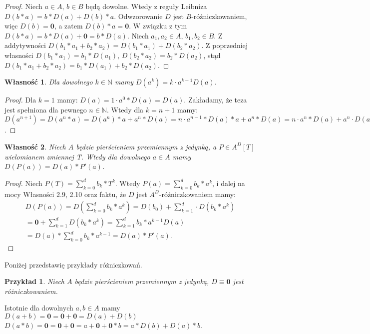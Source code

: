 \documentclass[12pt,a4paper]{article}
\newtheorem{exs}[ex]{Przykład}
\newtheorem{wl}{Własność}[section]
\numberwithin{equation}{section}
\begin{document}
\begin{proof}
Niech $a \in A$, $b \in B$ będą dowolne. Wtedy z reguły Leibniza $D(b*a)=b*D(a)+D(b)*a$. Odwzorowanie $D$ jest $B$-różniczkowaniem, więc $D(b)=\textbf{0}$, a zatem $D(b)*a=\textbf{0}$. W związku z tym  $D(b*a)=b*D(a)+\textbf{0}=b*D(a)$. Niech $a_{1},a_{2} \in A$, $b_{1},b_{2} \in B$. Z addytywności $D(b_{1}*a_{1}+b_{2}*a_{2})=D(b_{1}*a_{1})+D(b_{2}*a_{2})$. Z poprzedniej własności $D(b_{1}*a_{1})=b_{1}*D(a_{1})$, $D(b_{2}*a_{2})=b_{2}*D(a_{2})$, stąd  $D(b_{1}*a_{1}+b_{2}*a_{2})=b_{1}*D(a_{1})+b_{2}*D(a_{2})$.
\end{proof}
\begin{wl}
Dla dowolnego $k \in \mathbb{N}$ mamy $D(a^{k})=k \cdot a^{k-1}D(a)$.
\end{wl}
\begin{proof}
Dla $k=1$ mamy: $D(a)=1 \cdot a^{0}*D(a)=D(a)$. Zakładamy, że teza jest spełniona dla pewnego $n \in \mathbb{N}$. Wtedy dla $k=n+1$ mamy: $D(a^{n+1})=D(a^{n}*a)=D(a^{n})*a + a^{n}*D(a)=n \cdot a^{n-1} *D(a)*a + a^{n}*D(a)= n \cdot a^{n} * D(a)+a^{n} \cdot D(a)= (n+1) \cdot a^{(n+1)-1} \cdot D(a)$.
\end{proof}
\begin{wl}
Niech $A$ będzie pierścieniem przemiennym z jedynką, a $P \in A^{D}[T]$ wielomianem zmiennej T. Wtedy dla dowolnego $a \in A$ mamy $D(P(a))=D(a)*P'(a)$.
\end{wl}
\begin{proof}
Niech $\displaystyle P(T)= \sum_{k=0}^{d} b_{k} * T^{k}$. Wtedy $\displaystyle P(a)= \sum_{k=0}^{d} b_{k} * a^{k}$, i dalej na mocy Własności 2.9, 2.10 oraz faktu, że $D$ jest $A^D$-różniczkowaniem mamy:
\begin{align*}
  D(P(a))= D(\sum_{k=0}^{d} b_{k} * a^{k} )=D(b_{0})+\sum_{k=1}^{d}  \cdot D(b_{k} * a^{k})\\
  =\textbf{0}+\sum_{k=1}^{d} D(b_{k} * a^{k}) = \sum_{k=1}^{d} b_{k} *a^{k-1}D(a)\\
  =D(a)*\sum_{k=0}^{d} b_{k} *a^{k-1}=D(a)*P'(a).
\end{align*}

\end{proof}

Poniżej przedstawię przykłady różniczkowań.
\begin{exs}
Niech $A$ będzie pierścieniem przemiennym z jedynką, $D \equiv \textbf{0}$ jest różniczkowaniem.
\end{exs}

Istotnie dla dowolnych $a,b \in A$ mamy
\\ $D(a+b)=\textbf{0}=\textbf{0}+\textbf{0}=D(a)+D(b)$
\\$D(a*b)=\textbf{0}=\textbf{0}+\textbf{0}=a+\textbf{0}+\textbf{0}*b=a*D(b)+D(a)*b$.
\end{document}
